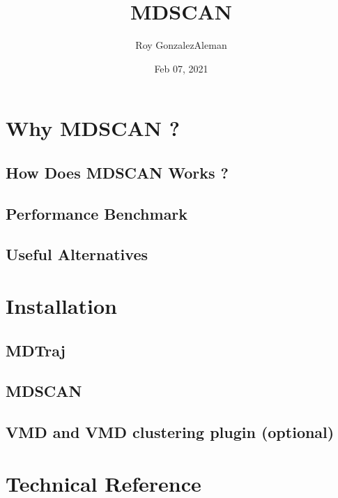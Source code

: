 \documentclass[letterpaper,10pt,english]{sphinxmanual}
\title{MDSCAN}
\date{Feb 07, 2021}
\author{Roy Gonzalez\sphinxhyphen{}Aleman}
\begin{document}
\pagestyle{empty}
\sphinxmaketitle
\pagestyle{plain}
\sphinxtableofcontents
\pagestyle{normal}
\label{\detokenize{index::doc}}



\chapter{Why MDSCAN ?}
\label{\detokenize{description:why-mdscan}}\label{\detokenize{description::doc}}

\section{How Does MDSCAN Works ?}
\label{\detokenize{description:how-does-mdscan-works}}

\section{Performance Benchmark}
\label{\detokenize{description:performance-benchmark}}

\section{Useful Alternatives}
\label{\detokenize{description:useful-alternatives}}

\chapter{Installation}
\label{\detokenize{installation:installation}}\label{\detokenize{installation::doc}}

\section{MDTraj}
\label{\detokenize{installation:mdtraj}}

\section{MDSCAN}
\label{\detokenize{installation:mdscan}}

\section{VMD and VMD clustering plugin (optional)}
\label{\detokenize{installation:vmd-and-vmd-clustering-plugin-optional}}

\chapter{Technical Reference}
\label{\detokenize{technical:technical-reference}}\label{\detokenize{technical::doc}}
\end{document}
